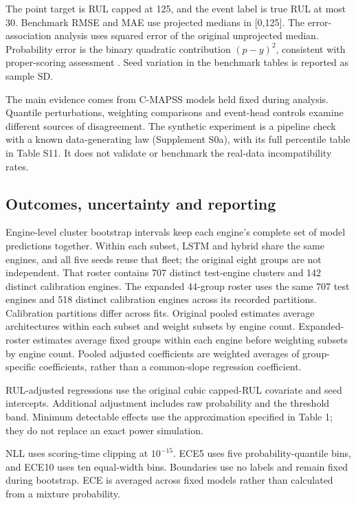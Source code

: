 \documentclass[IJPHM, 2026, 0]{phmsociety}
\begin{document}
The point target is RUL capped at \mbox{125}, and the event label is true RUL at most 30. Benchmark RMSE and MAE use projected medians in {[}\mbox{0},\mbox{125}{]}. The error-association analysis uses squared error of the original unprojected median. Probability error is the binary quadratic contribution \((p-y)^2\), consistent with proper-scoring assessment \cite{gneiting2007scoring}. Seed variation in the benchmark tables is reported as sample SD.

The main evidence comes from C-MAPSS models held fixed during analysis. Quantile perturbations, weighting comparisons and event-head controls examine different sources of disagreement. The synthetic experiment is a pipeline check with a known data-generating law (Supplement S0a), with its full percentile table in Table S11. It does not validate or benchmark the real-data incompatibility rates.

\subsection{Outcomes, uncertainty and reporting}\label{outcomes-uncertainty-and-reporting}

Engine-level cluster bootstrap intervals keep each engine's complete set of model predictions together. Within each subset, LSTM and hybrid share the same engines, and all five seeds reuse that fleet; the original eight groups are not independent. That roster contains \mbox{707} distinct test-engine clusters and \mbox{142} distinct calibration engines. The expanded \mbox{44}-group roster uses the same \mbox{707} test engines and \mbox{518} distinct calibration engines across its recorded partitions. Calibration partitions differ across fits. Original pooled estimates average architectures within each subset and weight subsets by engine count. Expanded-roster estimates average fixed groups within each engine before weighting subsets by engine count. Pooled adjusted coefficients are weighted averages of group-specific coefficients, rather than a common-slope regression coefficient.

RUL-adjusted regressions use the original cubic capped-RUL covariate and seed intercepts. Additional adjustment includes raw probability and the threshold band. Minimum detectable effects use the approximation specified in Table \mbox{1}; they do not replace an exact power simulation.

NLL uses scoring-time clipping at \(10^{-15}\). ECE5 uses five probability-quantile bins, and ECE10 uses ten equal-width bins. Boundaries use no labels and remain fixed during bootstrap. ECE is averaged across fixed models rather than calculated from a mixture probability.
\end{document}
